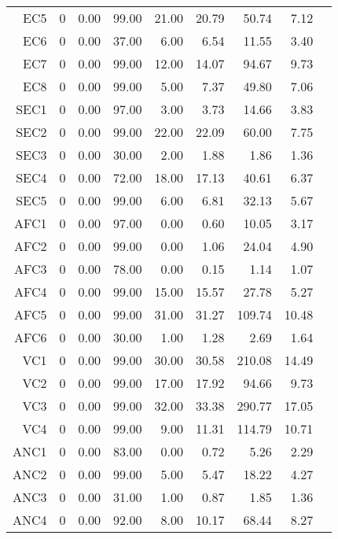 \begin{longtable}{|rrrrrrrrr|}
	EC5  &  0  &  0.00  &  99.00  &  21.00  &  20.79  &  50.74  &  7.12 & \\
	EC6  &  0  &  0.00  &  37.00  &  6.00  &  6.54  &  11.55  &  3.40 & \\
	EC7  &  0  &  0.00  &  99.00  &  12.00  &  14.07  &  94.67  &  9.73 & \\
	EC8  &  0  &  0.00  &  99.00  &  5.00  &  7.37  &  49.80  &  7.06 & \\
	SEC1  &  0  &  0.00  &  97.00  &  3.00  &  3.73  &  14.66  &  3.83 & \\
	SEC2  &  0  &  0.00  &  99.00  &  22.00  &  22.09  &  60.00  &  7.75 & \\
	SEC3  &  0  &  0.00  &  30.00  &  2.00  &  1.88  &  1.86  &  1.36 & \\
	SEC4  &  0  &  0.00  &  72.00  &  18.00  &  17.13  &  40.61  &  6.37 & \\
	SEC5  &  0  &  0.00  &  99.00  &  6.00  &  6.81  &  32.13  &  5.67 & \\
	AFC1  &  0  &  0.00  &  97.00  &  0.00  &  0.60  &  10.05  &  3.17 & \\
	AFC2  &  0  &  0.00  &  99.00  &  0.00  &  1.06  &  24.04  &  4.90 & \\
	AFC3  &  0  &  0.00  &  78.00  &  0.00  &  0.15  &  1.14  &  1.07 & \\
	AFC4  &  0  &  0.00  &  99.00  &  15.00  &  15.57  &  27.78  &  5.27 & \\
	AFC5  &  0  &  0.00  &  99.00  &  31.00  &  31.27  &  109.74  &  10.48 & \\
	AFC6  &  0  &  0.00  &  30.00  &  1.00  &  1.28  &  2.69  &  1.64 & \\
	VC1  &  0  &  0.00  &  99.00  &  30.00  &  30.58  &  210.08  &  14.49 & \\
	VC2  &  0  &  0.00  &  99.00  &  17.00  &  17.92  &  94.66  &  9.73 & \\
	VC3  &  0  &  0.00  &  99.00  &  32.00  &  33.38  &  290.77  &  17.05 & \\
	VC4  &  0  &  0.00  &  99.00  &  9.00  &  11.31  &  114.79  &  10.71 & \\
	ANC1  &  0  &  0.00  &  83.00  &  0.00  &  0.72  &  5.26  &  2.29 & \\
	ANC2  &  0  &  0.00  &  99.00  &  5.00  &  5.47  &  18.22  &  4.27 & \\
	ANC3  &  0  &  0.00  &  31.00  &  1.00  &  0.87  &  1.85  &  1.36 & \\
	ANC4  &  0  &  0.00  &  92.00  &  8.00  &  10.17  &  68.44  &  8.27 & \\

\end{longtable}

